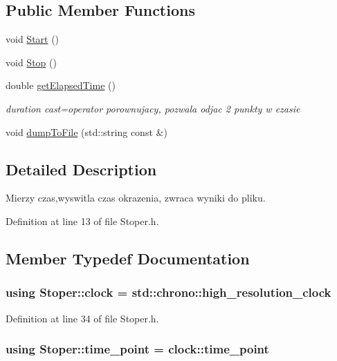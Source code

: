 \subsection*{Public Member Functions}
\begin{DoxyCompactItemize}
\item 
void \hyperlink{class_stoper_a5cfc1f0da41e5ca2728e2d80b8da72b9}{Start} ()
\item 
void \hyperlink{class_stoper_a0890e704c10c35d858490eb68b04df7e}{Stop} ()
\item 
double \hyperlink{class_stoper_a8f50bbba9cb719ca9d573a5cb4a19e36}{get\-Elapsed\-Time} ()
\begin{DoxyCompactList}\small\item\em duration cast=operator porownujacy, pozwala odjac 2 punkty w czasie \end{DoxyCompactList}\item 
void \hyperlink{class_stoper_a4a5dd13c26112cb43b11203fe9f7d4a7}{dump\-To\-File} (std\-::string const \&)
\end{DoxyCompactItemize}


\subsection{Detailed Description}
Mierzy czas,wyswitla czas okrazenia, zwraca wyniki do pliku. 

Definition at line 13 of file Stoper.\-h.



\subsection{Member Typedef Documentation}
\hypertarget{class_stoper_ac7b1a0995c65c28a71e3ceabf5c6f965}{
\subsubsection[{clock}]{\setlength{\rightskip}{0pt plus 5cm}using {\bf Stoper\-::clock} =  std\-::chrono\-::high\-\_\-resolution\-\_\-clock}}\label{class_stoper_ac7b1a0995c65c28a71e3ceabf5c6f965}


Definition at line 34 of file Stoper.\-h.

\hypertarget{class_stoper_a7d5d891cde8e9882bea254614a0fd2dd}{
\subsubsection[{time\-\_\-point}]{\setlength{\rightskip}{0pt plus 5cm}using {\bf Stoper\-::time\-\_\-point} =  clock\-::time\-\_\-point}}\label{class_stoper_a7d5d891cde8e9882bea254614a0fd2dd}


